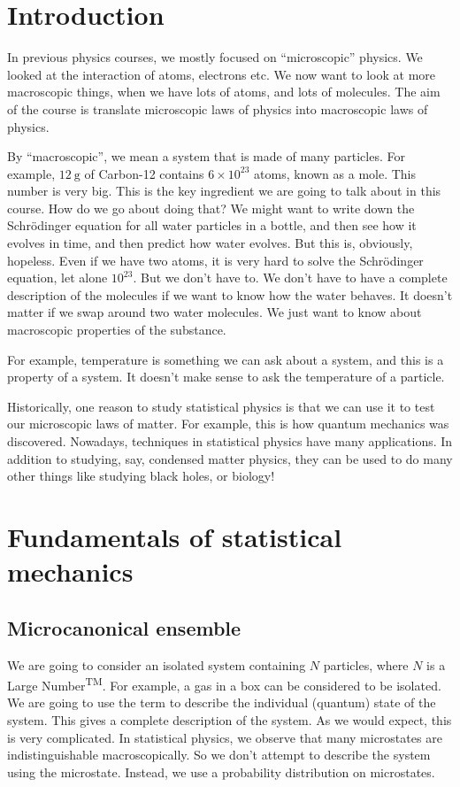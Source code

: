 \documentclass[a4paper]{article}
\begin{document}
\section{Introduction}
In previous physics courses, we mostly focused on ``microscopic'' physics. We looked at the interaction of atoms, electrons etc. We now want to look at more macroscopic things, when we have lots of atoms, and lots of molecules. The aim of the course is translate microscopic laws of physics into macroscopic laws of physics.

By ``macroscopic'', we mean a system that is made of many particles. For example, $\SI{12}{\gram}$ of Carbon-12 contains $6 \times 10^{23}$ atoms, known as a mole. This number is very big. This is the key ingredient we are going to talk about in this course. How do we go about doing that? We might want to write down the Schr\"odinger equation for all water particles in a bottle, and then see how it evolves in time, and then predict how water evolves. But this is, obviously, hopeless. Even if we have two atoms, it is very hard to solve the Schr\"odinger equation, let alone $10^{23}$. But we don't have to. We don't have to have a complete description of the molecules if we want to know how the water behaves. It doesn't matter if we swap around two water molecules. We just want to know about macroscopic properties of the substance.

For example, temperature is something we can ask about a system, and this is a property of a system. It doesn't make sense to ask the temperature of a particle.

Historically, one reason to study statistical physics is that we can use it to test our microscopic laws of matter. For example, this is how quantum mechanics was discovered. Nowadays, techniques in statistical physics have many applications. In addition to studying, say, condensed matter physics, they can be used to do many other things like studying black holes, or biology!

\section{Fundamentals of statistical mechanics}
\subsection{Microcanonical ensemble}
We are going to consider an isolated system containing $N$ particles, where $N$ is a Large Number\textsuperscript{TM}. For example, a gas in a box can be considered to be isolated. We are going to use the term  to describe the individual (quantum) state of the system. This gives a complete description of the system. As we would expect, this is very complicated. In statistical physics, we observe that many microstates are indistinguishable macroscopically. So we don't attempt to describe the system using the microstate. Instead, we use a probability distribution on microstates.
\end{document}
